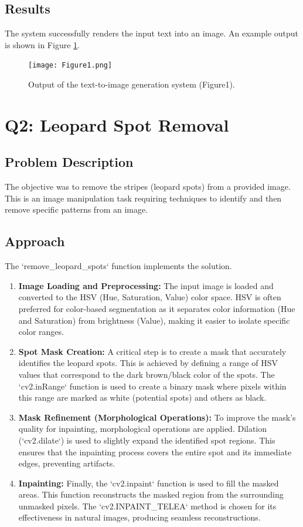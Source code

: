 \documentclass[12pt]{article}
\begin{document}
\subsection*{Results}
The system successfully renders the input text into an image. An example output is shown in Figure \ref{fig:text_to_image}.

\begin{figure}[h!]
    \centering
    \texttt{[image: Figure1.png]} %
    \caption{Output of the text-to-image generation system (Figure1).}
    \label{fig:text_to_image}
\end{figure}

\section*{Q2: Leopard Spot Removal}
\subsection*{Problem Description}
The objective was to remove the stripes (leopard spots) from a provided image. This is an image manipulation task requiring techniques to identify and then remove specific patterns from an image.

\subsection*{Approach}
The `remove_leopard_spots` function implements the solution.
\begin{enumerate}
    \item \textbf{Image Loading and Preprocessing:} The input image is loaded and converted to the HSV (Hue, Saturation, Value) color space. HSV is often preferred for color-based segmentation as it separates color information (Hue and Saturation) from brightness (Value), making it easier to isolate specific color ranges.
    \item \textbf{Spot Mask Creation:} A critical step is to create a mask that accurately identifies the leopard spots. This is achieved by defining a range of HSV values that correspond to the dark brown/black color of the spots. The `cv2.inRange` function is used to create a binary mask where pixels within this range are marked as white (potential spots) and others as black.
    \item \textbf{Mask Refinement (Morphological Operations):} To improve the mask's quality for inpainting, morphological operations are applied. Dilation (`cv2.dilate`) is used to slightly expand the identified spot regions. This ensures that the inpainting process covers the entire spot and its immediate edges, preventing artifacts.
    \item \textbf{Inpainting:} Finally, the `cv2.inpaint` function is used to fill the masked areas. This function reconstructs the masked region from the surrounding unmasked pixels. The `cv2.INPAINT_TELEA` method is chosen for its effectiveness in natural images, producing seamless reconstructions.
\end{enumerate}
\end{document}
